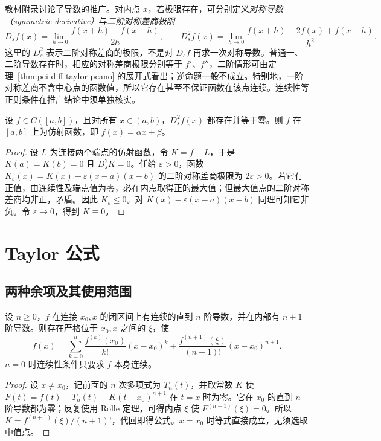 教材附录讨论了导数的推广。对内点 $x$，若极限存在，可分别定义\emph{对称导数（symmetric derivative）}与\emph{二阶对称差商极限}
\[
 D_s f(x)=\lim_{h\to0}\frac{f(x+h)-f(x-h)}{2h},\qquad
 D_s^2 f(x)=\lim_{h\to0}\frac{f(x+h)-2f(x)+f(x-h)}{h^2}.
\]
这里的 $D_s^2$ 表示二阶对称差商的极限，不是对 $D_s f$ 再求一次对称导数。普通一、二阶导数存在时，相应的对称差商极限分别等于 $f'$、$f''$，二阶情形可由定理~\ref{thm:pei-diff-taylor-peano} 的展开式看出；逆命题一般不成立。特别地，一阶对称差商不含中心点的函数值，所以它存在甚至不保证函数在该点连续。连续性等正则条件在推广结论中须单独核实。

\begin{proposition}
\label{prop:pei-diff-symmetric-affine}
设 $f\in C([a,b])$，且对所有 $x\in(a,b)$，$D_s^2 f(x)$ 都存在并等于零。则 $f$ 在 $[a,b]$ 上为仿射函数，即 $f(x)=\alpha x+\beta$。
\end{proposition}
\begin{proof}
设 $L$ 为连接两个端点的仿射函数，令 $K=f-L$，于是 $K(a)=K(b)=0$ 且 $D_s^2K=0$。任给 $\varepsilon>0$，函数
$K_\varepsilon(x)=K(x)+\varepsilon(x-a)(x-b)$ 的二阶对称差商极限为 $2\varepsilon>0$。若它有正值，由连续性及端点值为零，必在内点取得正的最大值；但最大值点的二阶对称差商均非正，矛盾。因此 $K_\varepsilon\le0$。对 $K(x)-\varepsilon(x-a)(x-b)$ 同理可知它非负。令 $\varepsilon\to0$，得到 $K\equiv0$。
\end{proof}

\section{Taylor 公式}
\label{sec:pei-diff-taylor}

\subsection{两种余项及其使用范围}

\begin{theorem}
\label{thm:pei-diff-taylor-lagrange}
设 $n\ge0$，$f$ 在连接 $x_0,x$ 的闭区间上有连续的直到 $n$ 阶导数，并在内部有 $n+1$ 阶导数。则存在严格位于 $x_0,x$ 之间的 $\xi$，使
\begin{equation}
 f(x)=\sum_{k=0}^n\frac{f^{(k)}(x_0)}{k!}(x-x_0)^k
       +\frac{f^{(n+1)}(\xi)}{(n+1)!}(x-x_0)^{n+1}.
 \label{eq:pei-diff-taylor-lagrange}
\end{equation}
$n=0$ 时连续性条件只要求 $f$ 本身连续。
\end{theorem}
\begin{proof}
设 $x\ne x_0$，记前面的 $n$ 次多项式为 $T_n(t)$，并取常数 $K$ 使
$F(t)=f(t)-T_n(t)-K(t-x_0)^{n+1}$ 在 $t=x$ 时为零。它在 $x_0$ 的直到 $n$ 阶导数都为零；反复使用 Rolle 定理，可得内点 $\xi$ 使 $F^{(n+1)}(\xi)=0$。所以 $K=f^{(n+1)}(\xi)/(n+1)!$，代回即得公式。$x=x_0$ 时等式直接成立，无须选取中值点。
\end{proof}

